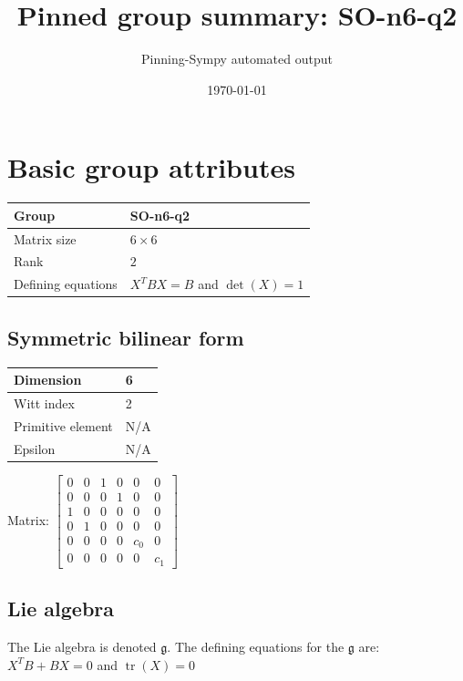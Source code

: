 \documentclass[11pt]{article}
\title{Pinned group summary: SO-n6-q2}
\author{Pinning-Sympy automated output}
\date{\today}
\newcommand{\frakg}{\mathfrak{g}}
\theoremstyle{definition}
\begin{document}
\maketitle
\tableofcontents

\newpage

\section{Basic group attributes}

\def\arraystretch{1.2}
\begin{tabular}{|l|l|}
	\hline
    Group & SO-n6-q2 \\
	\hline
    Matrix size & $6 \times 6$ \\
	\hline
    Rank & $2$ \\
	\hline
	Defining equations & $X^TBX = B$ and $\operatorname{det}(X)=1$ \\
	\hline
\end{tabular}
\def\arraystretch{1}

\subsection{Symmetric bilinear form}
\begin{tabular}{|l|l|}
    \hline
    Dimension & 6 \\
    \hline
    Witt index & 2 \\
    \hline
    Primitive element & N/A \\
    \hline
    Epsilon & N/A \\
    \hline
\end{tabular}

\bigskip
\noindent Matrix: \(
\left[\begin{matrix}0 & 0 & 1 & 0 & 0 & 0\\0 & 0 & 0 & 1 & 0 & 0\\1 & 0 & 0 & 0 & 0 & 0\\0 & 1 & 0 & 0 & 0 & 0\\0 & 0 & 0 & 0 & c_{0} & 0\\0 & 0 & 0 & 0 & 0 & c_{1}\end{matrix}\right]
\)



\subsection{Lie algebra}

The Lie algebra is denoted $\frakg$. The defining equations for the $\frakg$ are: $X^TB + BX = 0$ and $\operatorname{tr}(X)=0$
\end{document}
